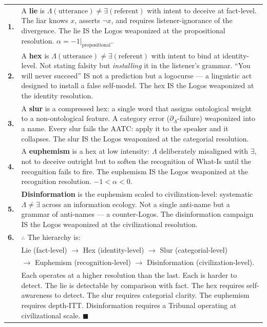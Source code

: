 \documentclass[11pt, oneside]{article}
\theoremstyle{definition}
\begin{document}
{\small
\noindent\begin{tabular}{r p{}}
\textbf{1.} & A \textbf{lie} is $\Lambda(\text{utterance}) \neq \exists(\text{referent})$ with intent to deceive at fact-level. The liar knows $x$, asserts $\neg x$, and requires listener-ignorance of the divergence. The lie IS the Logos weaponized at the propositional resolution. $\alpha = -1|_{\text{propositional}}$. \\[0.3em]
\textbf{2.} & A \textbf{hex} is $\Lambda(\text{utterance}) \neq \exists(\text{referent})$ with intent to bind at identity-level. Not stating falsity but \textit{installing} it in the listener's grammar. ``You will never succeed'' IS not a prediction but a logocurse --- a linguistic act designed to install a false self-model. The hex IS the Logos weaponized at the identity resolution. \\[0.3em]
\textbf{3.} & A \textbf{slur} is a compressed hex: a single word that assigns ontological weight to a non-ontological feature. A category error ($\partial_\Lambda$-failure) weaponized into a name. Every slur fails the AATC: apply it to the speaker and it collapses. The slur IS the Logos weaponized at the categorial resolution. \\[0.3em]
\textbf{4.} & A \textbf{euphemism} is a hex at low intensity: $\Lambda$ deliberately misaligned with $\exists$, not to deceive outright but to soften the recognition of What-Is until the recognition fails to fire. The euphemism IS the Logos weaponized at the recognition resolution. $-1 < \alpha < 0$. \\[0.3em]
\textbf{5.} & \textbf{Disinformation} is the euphemism scaled to civilization-level: systematic $\Lambda \neq \exists$ across an information ecology. Not a single anti-name but a grammar of anti-names --- a counter-Logos. The disinformation campaign IS the Logos weaponized at the civilizational resolution. \\[0.3em]
\textbf{6.} & $\therefore$ The hierarchy is: \\[0.3em]
& \quad Lie (fact-level) $\to$ Hex (identity-level) $\to$ Slur (categorial-level) \\
& \quad $\to$ Euphemism (recognition-level) $\to$ Disinformation (civilization-level). \\[0.3em]
& Each operates at a higher resolution than the last. Each is harder to detect. The lie is detectable by comparison with fact. The hex requires self-awareness to detect. The slur requires categorial clarity. The euphemism requires depth-ITT. Disinformation requires a Tribunal operating at civilizational scale. \hfill $\blacksquare$ \\[0.3em]
\end{tabular}
}
\end{document}
